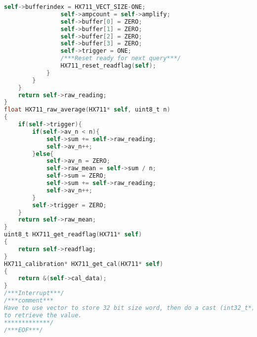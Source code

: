 \begin{lstlisting}[language=C]
				self->bufferindex = HX711_VECT_SIZE-ONE;
				self->ampcount = self->amplify;
				self->buffer[0] = ZERO;
				self->buffer[1] = ZERO;
				self->buffer[2] = ZERO;
				self->buffer[3] = ZERO;
				self->trigger = ONE;
				/***Reset ready for next query***/
				HX711_reset_readflag(self);
			}
		}
	}
	return self->raw_reading;
}
float HX711_raw_average(HX711* self, uint8_t n)
{
	if(self->trigger){
		if(self->av_n < n){
			self->sum += self->raw_reading;
			self->av_n++;
		}else{
			self->av_n = ZERO;
			self->raw_mean = self->sum / n;
			self->sum = ZERO;
			self->sum += self->raw_reading;
			self->av_n++;
		}
		self->trigger = ZERO;
	}
	return self->raw_mean;
}
uint8_t HX711_get_readflag(HX711* self)
{
	return self->readflag;
}
HX711_calibration* HX711_get_cal(HX711* self)
{
	return &(self->cal_data);
}
/***Interrupt***/
/***comment***
Have to use vector to store 32 bit size word, then do a cast (int32_t*)
to retrieve the value.
*************/
/***EOF***/
\end{lstlisting}
